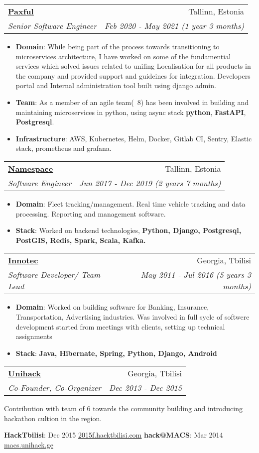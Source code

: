 \documentclass[letterpaper,11pt]{article}
\makeatletter
\newcommand{\resumeItem}[2]{
  \item\small{
    \textbf{#1}{: #2 \vspace{-2pt}}
  }
}
\newcommand{\resumeSubheading}[4]{
  \vspace{-1pt}\item
    \begin{tabular*}{0.97\textwidth}{l@{\extracolsep{\fill}}r}
      \textbf{#1} & #2 \\
      \textit{\small#3} & \textit{\small #4} \\
    \end{tabular*}\vspace{-5pt}
}
\newcommand{\resumeItemListStart}{\begin{itemize}}
\newcommand{\resumeItemListEnd}{\end{itemize}\vspace{-5pt}}
\makeatother
\begin{document}
\resumeSubheading
      {\href{https://paxful.com}{\underline{Paxful}}}{Tallinn, Estonia}
      {Senior Software Engineer}{Feb 2020 - May 2021 (1 year 3 months)}
      \resumeItemListStart
        \resumeItem{Domain}{While being part of the process towards transitioning to microservices architecture, I have worked on some of the fundamential services which solved issues related to unifing Localisation for all products in the company and provided support and guideines for integration. Developers portal and Internal administration tool built using django admin.}
        \resumeItem{Team}
          {As a member of an agile team(~8) has been involved in building and maintaining microservices in python, using async stack \textbf{python}, \textbf{FastAPI}, \textbf{Postgresql}.}
        \resumeItem{Infrastructure}
          {AWS, Kubernetes, Helm, Docker, Gitlab CI, Sentry, Elastic stack, prometheus and grafana.}
      \resumeItemListEnd
	
    \resumeSubheading
      {\href{https://namespace.ee}{\underline{Namespace}}}{Tallinn, Estonia}
      {Software Engineer}{Jun 2017 - Dec 2019 (2 years 7 months)}
      \resumeItemListStart
        \resumeItem{Domain}
          {Fleet tracking/management. Real time vehicle tracking and data processing. Reporting and management software.}
		\resumeItem{Stack}
          {Worked on backend technologies, \textbf{Python, Django, Postgresql, PostGIS, Redis, Spark, Scala, Kafka.}}
      \resumeItemListEnd

    \resumeSubheading
      {\href{http://innotec.ge/}{\underline{Innotec}}}{Georgia, Tbilisi}
      {Software Developer/ Team Lead}{May 2011 - Jul 2016 (5 years 3 months)}
      \resumeItemListStart
        \resumeItem{Domain}
          {Worked on building software for Banking, Insurance, Transportation, Advertising industries. Was involved in full sycle of softwere development started from meetings with clients, setting up technical assignments }
        \resumeItem{Stack}
          {\textbf{Java, Hibernate, Spring, Python, Django, Android}}
      \resumeItemListEnd
      
     \resumeSubheading
      {\href{https://www.facebook.com/unihackge/}{\underline{Unihack}}}{Georgia, Tbilisi}
      {Co-Founder, Co-Organizer}{Dec 2013 - Dec 2015}

		Contribution with team of 6 towards the community building and introducing hackathon cultion in the region.

     \textbf{HackTbilisi}{: Dec 2015 \href{https://www.facebook.com/events/684989148311419/}{\underline{2015f.hacktbilisi.com}}}
     \hfill
     \textbf{hack@MACS}{: Mar 2014 \href{https://www.facebook.com/events/449121528548787/}{\underline{macs.unihack.ge}}}
     
\end{document}
